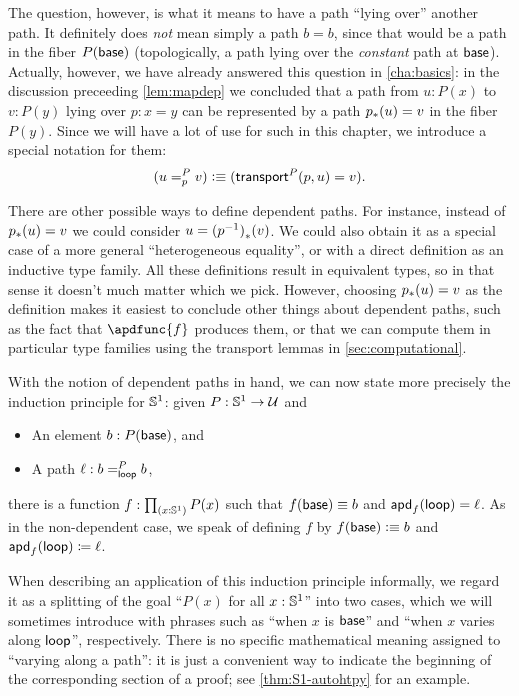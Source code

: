 The question, however, is what it means to have a path ``lying over'' another path.
It definitely does \emph{not} mean simply a path $b=b$, since that would be a path in the fiber $P(\base)$ (topologically, a path lying over the \emph{constant} path at $\base$).
Actually, however, we have already answered this question in \autoref{cha:basics}: in the discussion preceeding \autoref{lem:mapdep} we concluded that a path from $u:P(x)$ to $v:P(y)$ lying over $p:x=y$ can be represented by a path $\trans p u = v$ in the fiber $P(y)$.
Since we will have a lot of use for such 
%
in this chapter, we introduce a special notation for them:
\begin{equation}
  (\dpath P p u v) \defeq (\transfib{P} p u = v).\label{eq:dpath}
\end{equation}

\begin{rmk}
There are other possible ways to define dependent paths.
For instance, instead of $\trans p u = v$ we could consider $u = \trans{(\opp p)}{v}$.
We could also obtain it as a special case of a more general ``heterogeneous equality'', or with a direct definition as an inductive type family.
All these definitions result in equivalent types, so in that sense it doesn't much matter which we pick.
However, choosing $\trans p u = v$ as the definition makes it easiest to conclude other things about dependent paths, such as the fact that $\apdfunc{f}$ produces them, or that we can compute them in particular type families using the transport lemmas in \autoref{sec:computational}.
\end{rmk}

With the notion of dependent paths in hand, we can now state more precisely the induction principle for $\Sn^1$: given $P:\Sn^1\to\type$ and
\begin{itemize}
\item An element $b:P(\base)$, and
\item A path $\ell : \dpath P \lloop b b$,
\end{itemize}
there is a function $f:\prd{x:\Sn^1} P(x)$ such that $f(\base)\jdeq b$ and $\apd f \lloop = \ell$.
As in the non-dependent case, we speak of defining $f$ by $f(\base)\defeq b$ and $\apd f \lloop \defid \ell$.

\begin{rmk}\label{rmk:varies-along}
  When describing an application of this induction principle informally, we regard it as a splitting of the goal ``$P(x)$ for all $x:\Sn^1$'' into two cases, which we will sometimes introduce with phrases such as ``when $x$ is $\base$'' and ``when $x$ varies along $\lloop$'', respectively.
  There is no specific mathematical meaning assigned to ``varying along a path'': it is just a convenient way to indicate the beginning of the corresponding section of a proof; see \autoref{thm:S1-autohtpy} for an example.
\end{rmk}

